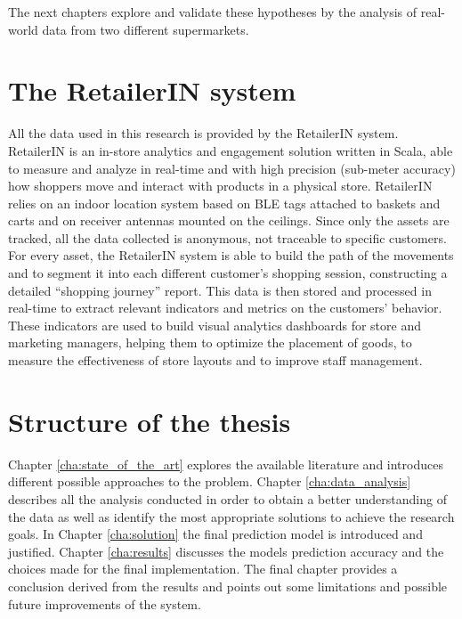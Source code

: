 The next chapters explore and validate these hypotheses by the analysis of real-world data from two different supermarkets.

\section{The RetailerIN system}
\label{sec:retailerin_system}

All the data used in this research is provided by the RetailerIN system. RetailerIN is an in-store analytics and engagement solution written in Scala, able to measure and analyze in real-time and with high precision (sub-meter accuracy) how shoppers move and interact with products in a physical store. RetailerIN relies on an indoor location system based on BLE tags attached to baskets and carts and on receiver antennas mounted on the ceilings. Since only the assets are tracked, all the data collected is anonymous, not traceable to specific customers. For every asset, the RetailerIN system is able to build the path of the movements and to segment it into each different customer’s shopping session, constructing a detailed “shopping journey” report. This data is then stored and processed in real-time to extract relevant indicators and metrics on the customers’ behavior. These indicators are used to build visual analytics dashboards for store and marketing managers, helping them to optimize the placement of goods, to measure the effectiveness of store layouts and to improve staff management.

\section{Structure of the thesis}
\label{sec:structure_of_the_thesis}

Chapter \ref{cha:state_of_the_art} explores the available literature and introduces different possible approaches to the problem. Chapter \ref{cha:data_analysis} describes all the analysis conducted in order to obtain a better understanding of the data as well as identify the most appropriate solutions to achieve the research goals. In Chapter \ref{cha:solution} the final prediction model is introduced and justified. Chapter \ref{cha:results} discusses the models prediction accuracy and the choices made for the final implementation. The final chapter provides a conclusion derived from the results and points out some limitations and possible future improvements of the system.

\clearpage